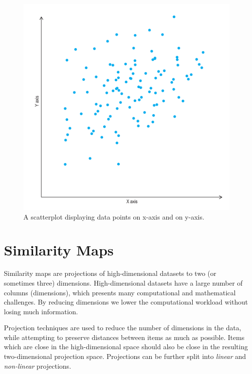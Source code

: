\begin{figure}[tp]
\centering
\includegraphics[frame,keepaspectratio,width=\linewidth,height=\halfh]
{diagrams/scatterplot.pdf}

\caption[Scatterplot]
{
A scatterplot displaying data points on x-axis and on y-axis.
}
\label{fig:ScatterplotDiagram}
\end{figure}





\section{Similarity Maps}

Similarity maps are projections of high-dimensional datasets to two (or
sometimes three) dimensions. High-dimensional datasets have a large number
of columns (dimensions), which presents many computational and
mathematical challenges. By reducing dimensions we lower the computational
workload without losing much information.

Projection techniques are used to reduce the number of dimensions in the
data, while attempting to preserve distances between items as much as
possible. Items which are close in the high-dimensional space should also
be close in the resulting two-dimensional projection space. Projections
can be further split into \emph{linear} and \emph{non-linear} projections. 


